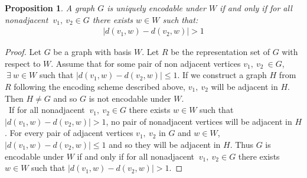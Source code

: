 \documentclass[11pt]{amsart}
\theoremstyle{plain}  %
\newtheorem{prop}[thm]{Proposition}
\theoremstyle{definition}
\theoremstyle{remark}
\numberwithin{equation}{thm}
\begin{document}
\begin{prop}
A graph $G$ is uniquely encodable under $W$ if and only if for all nonadjacent $\ v_1,\ v_2\in G$ there exists $w \in W$ such that:
\begin{align*}
| d(v_1,w)-d(v_2,w)| > 1 
\end{align*}
\end{prop}
\begin{proof}
Let $G$ be a graph with basis $W$. Let $R$ be the representation set of $G$ with respect to $W$. 
Assume that for some pair of non adjacent vertices $v_1,\ v_2\ \in G$, $\ \exists\ w \in W$ such that $\left| d(v_1,w)-d(v_2,w)\right| \leq 1$.
If we construct a graph $H$ from $R$ following the encoding scheme described above, $v_1,\ v_2$ will be adjacent in $H$. 
Then $H \neq G$ and so $G$ is not encodable under $W$.\\ 
\ If for all nonadjacent $\ v_1,\ v_2\in G$ there exists $w \in W$ such that 
$|d(v_1,w)-d(v_2,w)| > 1$, no pair of nonadjacent vertices will be adjacent in $H$. For every pair of adjacent vertices $v_1,\ v_2$ in $G$ and $w\in W$,  
$\left| d(v_1,w)-d(v_2,w)\right| \leq 1$ 
and so they will be adjacent in $H$. Thus $G$ is encodable under $W$ if and only if for all nonadjacent $\ v_1,\ v_2\in G$ there exists $w \in W$ such that $|d(v_1,w)-d(v_2,w)| > 1$.
\end{proof}
\clearpage
\end{document}
